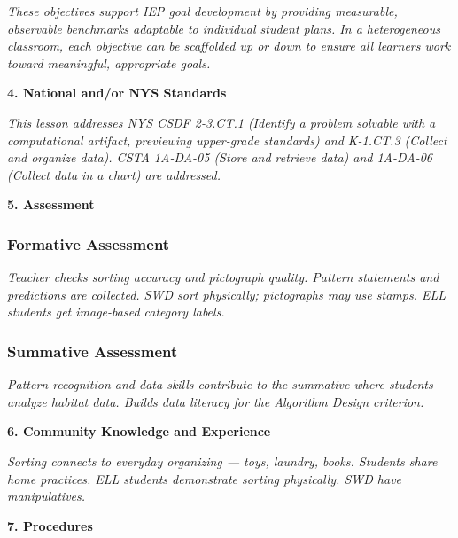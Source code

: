 \documentclass[11pt,letterpaper]{article}
\begin{document}
\textit{These objectives support IEP goal development by providing measurable, observable benchmarks adaptable to individual student plans. In a heterogeneous classroom, each objective can be scaffolded up or down to ensure all learners work toward meaningful, appropriate goals.}

\textbf{4. National and/or NYS Standards}

\textit{This lesson addresses NYS CSDF 2-3.CT.1 (Identify a problem solvable with a computational artifact, previewing upper-grade standards) and K-1.CT.3 (Collect and organize data). CSTA 1A-DA-05 (Store and retrieve data) and 1A-DA-06 (Collect data in a chart) are addressed.}

\newpage
\textbf{5. Assessment}

\subsubsection{Formative Assessment}

\textit{Teacher checks sorting accuracy and pictograph quality. Pattern statements and predictions are collected. SWD sort physically; pictographs may use stamps. ELL students get image-based category labels.}

\subsubsection{Summative Assessment}

\textit{Pattern recognition and data skills contribute to the summative where students analyze habitat data. Builds data literacy for the Algorithm Design criterion.}

\textbf{6. Community Knowledge and Experience}

\textit{Sorting connects to everyday organizing --- toys, laundry, books. Students share home practices. ELL students demonstrate sorting physically. SWD have manipulatives.}

\textbf{7. Procedures}
\end{document}
